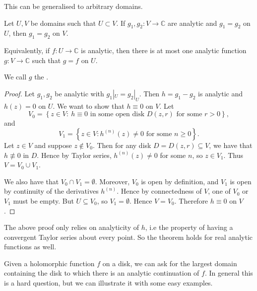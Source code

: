 \documentclass[egregdoesnotlikesansseriftitles,a4paper]{scrartcl}
\begin{document}
This can be generalised to arbitrary domains.
\begin{theorem}
      Let $U,V$ be domains such that $U \subset V$. If $g_1 ,g_2 : V \rightarrow \mathbb{C}$ are analytic and $g_1 =g_2 $ on $U$, then $g_1 =g_2 $ on $V$.

      Equivalently, if $f: U \rightarrow \mathbb{C}$ is analytic, then there is at most one analytic function $g: V \rightarrow \mathbb{C}$ such that $g=f$ on $U$.
      \begin{notation}
           We call $g$ the .
      \end{notation}
      \begin{proof}
          Let $g_1 ,g_2 $ be analytic with $g_1 |_{U}=g_2 |_{U}$. Then $h=g_1 -g_2 $ is analytic and $h (z)=0$ on $U$. We want to show that $h\equiv 0$ on $V$. Let \[
          V_0 = \left\{z \in V: \ h \equiv 0 \text{ in some open disk } D (z,r)\text{ for some } r>0\right\}
          ,\] and \[
          V_1 =\left\{z \in V: h^{(n)}(z)\neq 0 \text{ for some } n \geq 0\right\}
          .\] Let $z \in V$ and suppose $z \notin V_0 $. Then for any disk $D = D (z,r) \subseteq V$, we have that $h \not \equiv 0$ in $D$. Hence by Taylor series, $h^{(n)}(z)\neq 0 $ for some $n$, so $z \in V_1 $. Thus $V = V_0 \cup V_1 $.

          We also have that $V_0 \cap V_1 = \emptyset$. Moreover, $V_0 $ is open by definition, and $V_1 $ is open by continuity of the derivatives $h^{(n)}$. Hence by connectedness of $V$, one of $V_0 $ or $V_1 $ must be empty. But $U \subseteq V_0 $, so $V_1 = \emptyset$. Hence $V=V_0 $. Therefore $h \equiv 0$ on $V$.
    \end{proof}
    \begin{remark}
          The above proof only relies on analyticity of $h$, i.e the property of having a convergent Taylor series about every point. So the theorem holds for real analytic functions as well.
    \end{remark}
\end{theorem}
Given a holomorphic function $f$ on a disk, we can ask for the largest domain containing the disk to which there is an analytic continuation of $f$. In general this is a hard question, but we can illustrate it with some easy examples.
\end{document}
